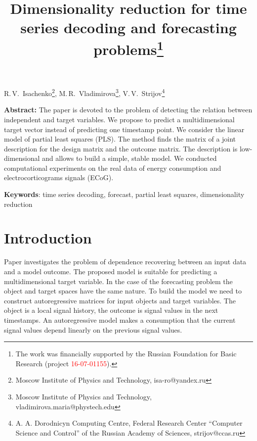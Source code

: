 \documentclass[12pt,twoside]{article}
\begin{document}
	\title
	{Dimensionality reduction for time series decoding and forecasting problems\thanks{The work was financially supported by the Russian Foundation for Basic Research (project \textcolor{red}{16-07-01155}).}}
	\date{}
	\maketitle
	\begin{center}
		R.\,V.~Isachenko\footnote{Moscow Institute of Physics and Technology, isa-ro@yandex.ru},
		M.\,R.~Vladimirova\footnote{Moscow Institute of Physics and Technology, vladimirova.maria@phystech.edu},
		V.\,V.~Strijov\footnote{A. A. Dorodnicyn Computing Centre, Federal Research Center “Computer Science and Control” of the Russian Academy of Sciences, strijov@ccas.ru}
	\end{center}
	\textbf{Abstract:} 
	The paper is devoted to the problem of detecting the relation between independent and target variables.
	We propose to predict a multidimensional target vector instead of predicting one timestamp point.
	We consider the linear model of partial least squares (PLS).
	The method finds the matrix of a joint description for the design matrix and the outcome matrix.
	The description is low-dimensional and allows to build a simple, stable model.
	We conducted computational experiments on the real data of energy consumption and electrocorticograms signals (ECoG).
	
	\bigskip
	\textbf{Keywords}: time series decoding, forecast, partial least squares, dimensionality reduction

\linenumbers
\section{Introduction}

Paper investigates the problem of dependence recovering between an input data and a model outcome.
The proposed model is suitable for predicting a multidimensional target variable.
In the case of the forecasting problem the object and target spaces have the same nature.
To build the model we need to construct autoregressive matrices for input objects and target variables.
The object is a local signal history, the outcome is signal values in the next timestamps.
An autoregressive model makes a consumption that the current signal values depend linearly on the previous signal values.
\end{document}
